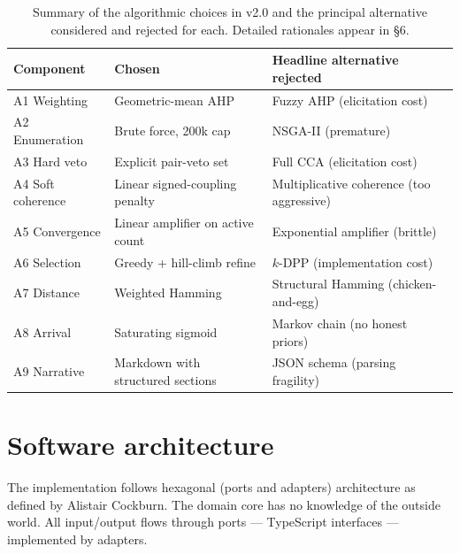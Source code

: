\documentclass[11pt,a4paper]{article}
\begin{document}
\begin{table}[H]
\centering
\small
\begin{tabularx}{\textwidth}{@{}l X X@{}}
\toprule
\textbf{Component} & \textbf{Chosen} & \textbf{Headline alternative rejected} \\
\midrule
A1 Weighting        & Geometric-mean AHP             & Fuzzy AHP (elicitation cost) \\
A2 Enumeration      & Brute force, 200k cap          & NSGA-II (premature) \\
A3 Hard veto        & Explicit pair-veto set         & Full CCA (elicitation cost) \\
A4 Soft coherence   & Linear signed-coupling penalty & Multiplicative coherence (too aggressive) \\
A5 Convergence      & Linear amplifier on active count & Exponential amplifier (brittle) \\
A6 Selection        & Greedy + hill-climb refine     & $k$-DPP (implementation cost) \\
A7 Distance         & Weighted Hamming               & Structural Hamming (chicken-and-egg) \\
A8 Arrival          & Saturating sigmoid             & Markov chain (no honest priors) \\
A9 Narrative        & Markdown with structured sections & JSON schema (parsing fragility) \\
\bottomrule
\end{tabularx}
\caption{Summary of the algorithmic choices in v2.0 and the principal alternative considered and rejected for each. Detailed rationales appear in §6.}
\end{table}

\section{Software architecture}

The implementation follows hexagonal (ports and adapters) architecture as defined by Alistair Cockburn. The domain core has no knowledge of the outside world. All input/output flows through ports — TypeScript interfaces — implemented by adapters.
\end{document}
